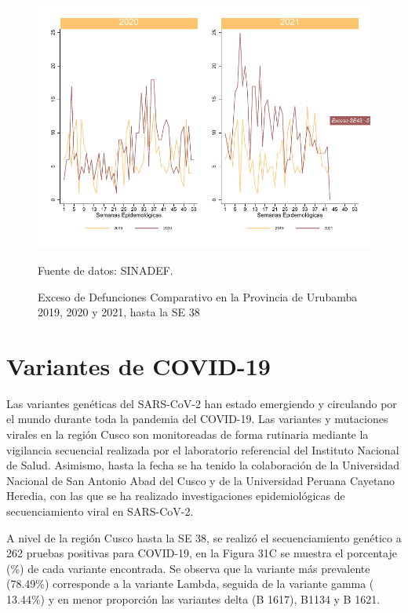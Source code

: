 \documentclass[12pt,a4paper,openany]{book}
\begin{document}
	\begin{figure}[h]
	\caption{Exceso de Defunciones Comparativo en la Provincia de Urubamba 2019, 2020 y 2021, hasta la SE 38}\label{fig:exceso_urub}
	\begin{center}
		\includegraphics[width=0.7\linewidth]{../figuras/exceso_13}
	\end{center}
	{\footnotesize {Fuente de datos: SINADEF.}}
	\end{figure}
	\chapter*{Variantes de COVID-19}
	\noindent Las variantes genéticas del SARS-CoV-2 han estado emergiendo y circulando por el mundo durante toda la pandemia del COVID-19. Las variantes y mutaciones virales en la región Cusco son monitoreadas de forma rutinaria mediante la vigilancia secuencial realizada por el laboratorio referencial del Instituto Nacional de Salud. Asimismo, hasta la fecha se ha tenido la colaboración de la Universidad Nacional de San Antonio Abad del Cusco y de la Universidad Peruana Cayetano Heredia, con las que se ha realizado investigaciones epidemiológicas de secuenciamiento viral en SARS-CoV-2.
	
	A nivel de la región Cusco hasta la SE 38,  se realizó el secuenciamiento genético a 262 pruebas positivas para COVID-19, en la Figura 31C se muestra el porcentaje (\%) de cada variante encontrada. Se observa que la variante más prevalente (78.49\%) corresponde a la variante Lambda, seguida de la variante gamma ( 13.44\%) y en menor proporción las variantes delta (B 1617), B1134 y B 1621.
	
\end{document}
